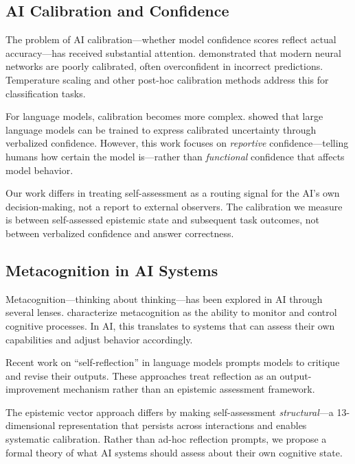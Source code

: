 
\subsection{AI Calibration and Confidence}

The problem of AI calibration---whether model confidence scores reflect actual accuracy---has received substantial attention. \citet{guo2017calibration} demonstrated that modern neural networks are poorly calibrated, often overconfident in incorrect predictions. Temperature scaling and other post-hoc calibration methods address this for classification tasks.

For language models, calibration becomes more complex. \citet{kadavath2022language} showed that large language models can be trained to express calibrated uncertainty through verbalized confidence. However, this work focuses on \emph{reportive} confidence---telling humans how certain the model is---rather than \emph{functional} confidence that affects model behavior.

Our work differs in treating self-assessment as a routing signal for the AI's own decision-making, not a report to external observers. The calibration we measure is between self-assessed epistemic state and subsequent task outcomes, not between verbalized confidence and answer correctness.

\subsection{Metacognition in AI Systems}

Metacognition---thinking about thinking---has been explored in AI through several lenses. \citet{fleming2012neural} characterize metacognition as the ability to monitor and control cognitive processes. In AI, this translates to systems that can assess their own capabilities and adjust behavior accordingly.

Recent work on ``self-reflection'' in language models \citep{shinn2023reflexion,madaan2023self} prompts models to critique and revise their outputs. These approaches treat reflection as an output-improvement mechanism rather than an epistemic assessment framework.

The epistemic vector approach differs by making self-assessment \emph{structural}---a 13-dimensional representation that persists across interactions and enables systematic calibration. Rather than ad-hoc reflection prompts, we propose a formal theory of what AI systems should assess about their own cognitive state.

